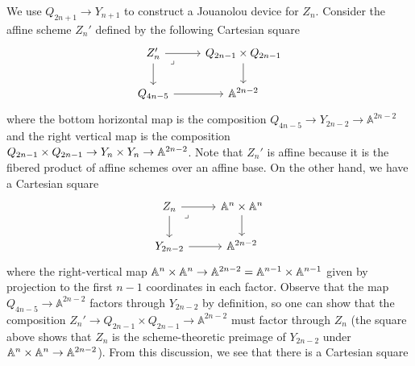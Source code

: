We use $Q_{2n+1} \to Y_{n+1}$ to construct a Jouanolou device for $Z_n$. Consider the affine scheme $Z_n'$ defined by the following Cartesian square
\[\begin{tikzcd}
	{Z_n'} & {Q_{2n-1} \times Q_{2n-1}} \\
	{Q_{4n-5}} & {\mathbb{A}^{2n-2}}
	\arrow[from=1-1, to=1-2]
	\arrow[from=1-1, to=2-1]
	\arrow["\lrcorner"{anchor=center, pos=0.125}, draw=none, from=1-1, to=2-2]
	\arrow[from=1-2, to=2-2]
	\arrow[from=2-1, to=2-2]
\end{tikzcd}\]
where the bottom horizontal map is the composition $Q_{4n-5} \to Y_{2n-2} \to \mathbb{A}^{2n-2}$ and the right vertical map is the composition $Q_{2n-1} \times Q_{2n-1} \to Y_{n} \times Y_{n} \to \mathbb{A}^{2n-2}$. Note that $Z_n'$ is affine because it is the fibered product of affine schemes over an affine base. On the other hand, we have a Cartesian square
\[\begin{tikzcd}
	{Z_n} & {\mathbb{A}^n \times \mathbb{A}^n} \\
	{Y_{2n-2}} & {\mathbb{A}^{2n-2}}
	\arrow[from=1-1, to=1-2]
	\arrow[from=1-1, to=2-1]
	\arrow["\lrcorner"{anchor=center, pos=0.125}, draw=none, from=1-1, to=2-2]
	\arrow[from=1-2, to=2-2]
	\arrow[from=2-1, to=2-2]
\end{tikzcd}\]
where the right-vertical map $\mathbb{A}^n \times \mathbb{A}^n \to \mathbb{A}^{2n-2} = \mathbb{A}^{n-1} \times \mathbb{A}^{n-1}$ given by projection to the first $n-1$ coordinates in each factor. Observe that the map $Q_{4n-5} \to \mathbb{A}^{2n-2}$ factors through $Y_{2n-2}$ by definition, so one can show that the composition $Z_n' \to Q_{2n-1} \times Q_{2n-1} \to \mathbb{A}^{2n-2}$ must factor through $Z_n$ (the square above shows that $Z_n$ is the scheme-theoretic preimage of $Y_{2n-2}$ under $\mathbb{A}^n \times \mathbb{A}^n \to \mathbb{A}^{2n-2}$). From this discussion, we see that there is a Cartesian square
